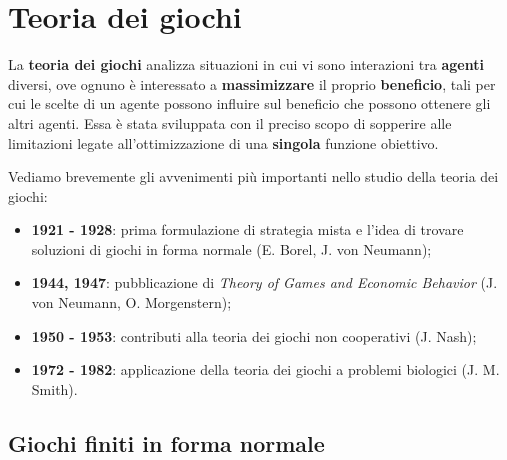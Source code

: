 
\chapter{Teoria dei giochi}
\label{cha:teoria_dei_giochi}

La \textbf{teoria dei giochi} analizza situazioni in cui vi sono interazioni tra \textbf{agenti} diversi, ove ognuno è interessato a \textbf{massimizzare} il proprio \textbf{beneficio}, tali per cui le scelte di un agente possono influire sul beneficio che possono ottenere gli altri agenti. Essa è stata sviluppata con il preciso scopo di sopperire alle limitazioni legate all'ottimizzazione di una \textbf{singola} funzione obiettivo.

Vediamo brevemente gli avvenimenti più importanti nello studio della teoria dei giochi:
\begin{itemize}
	\item \textbf{1921 - 1928}: prima formulazione di strategia mista e l'idea di trovare soluzioni di giochi in forma normale (E. Borel, J. von Neumann);
	\item \textbf{1944, 1947}: pubblicazione di 	\emph{Theory of Games and Economic Behavior} (J. von Neumann, O. Morgenstern);
	\item \textbf{1950 - 1953}: contributi alla teoria dei giochi non cooperativi (J. Nash);
	\item \textbf{1972 - 1982}: applicazione della teoria dei giochi a problemi biologici (J. M. Smith).
\end{itemize}

\section{Giochi finiti in forma normale}
\label{sec:giochi_finiti_in_forma_normale}


